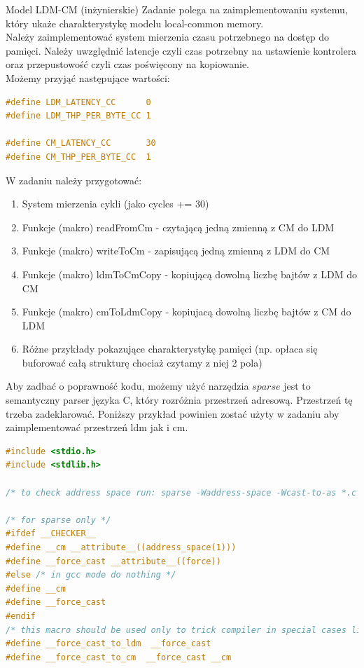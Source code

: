\begin{exercise}{Model LDM-CM (inżynierskie)}{}
Zadanie polega na zaimplementowaniu systemu, który ukaże charakterystykę modelu local-common memory. \\
Należy zaimplementować system mierzenia czasu potrzebnego na dostęp do pamięci. Należy uwzględnić latencje czyli czas potrzebny na ustawienie kontrolera oraz przepustowość czyli czas poświęcony na kopiowanie. \\
Możemy przyjąć następujące wartości:


\begin{lstlisting}[language=C,style=C99]
#define LDM_LATENCY_CC      0
#define LDM_THP_PER_BYTE_CC 1

#define CM_LATENCY_CC       30
#define CM_THP_PER_BYTE_CC  1
\end{lstlisting}

W zadaniu należy przygotować:
\begin{enumerate}
    \item System mierzenia cykli (jako cycles += 30)
    \item Funkcje (makro) readFromCm - czytającą jedną zmienną z CM do LDM
    \item Funkcje (makro) writeToCm - zapisującą jedną zmienną z LDM do CM
    \item Funkcje (makro) ldmToCmCopy - kopiującą dowolną liczbę bajtów z LDM do CM
    \item Funkcje (makro) cmToLdmCopy - kopiujacą dowolną liczbę bajtów z CM do LDM
    \item Różne przykłady pokazujące charakterystykę pamięci (np. opłaca się buforować całą strukturę chociaż czytamy z niej 2 pola)
\end{enumerate}

Aby zadbać o poprawność kodu, możemy użyć narzędzia $sparse$ jest to semantyczny parser języka C, który rozróżnia przestrzeń adresową. Przestrzeń tę trzeba zadeklarować. Poniższy przykład powinien zostać użyty w zadaniu aby zaimplementować przestrzeń ldm jak i cm.

\newpage

\begin{lstlisting}[language=C,style=C99]
#include <stdio.h>
#include <stdlib.h>

/* to check address space run: sparse -Waddress-space -Wcast-to-as *.c */

/* for sparse only */
#ifdef __CHECKER__
#define __cm __attribute__((address_space(1)))
#define __force_cast __attribute__((force))
#else /* in gcc mode do nothing */
#define __cm
#define __force_cast
#endif
/* this macro should be used only to trick compiler in special cases like below */
#define __force_cast_to_ldm  __force_cast
#define __force_cast_to_cm  __force_cast __cm


\end{lstlisting}
\end{exercise}
